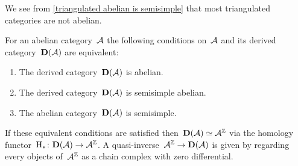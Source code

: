 \documentclass[a4paper,10pt]{scrartcl}
\begin{document}
We see from \cref{triangulated abelian is semisimple} that most triangulated categories are not abelian.

\begin{proposition}
  \label{when the derived is abelian}
  For an abelian category~$\mathcal{A}$ the following conditions on~$\mathcal{A}$ and its derived category~$\mathbf{D}(\mathcal{A})$ are equivalent:
  \begin{enumerate}
    \item
      \label{derived is abelian}
      The derived category~$\mathbf{D}(\mathcal{A})$ is abelian.
    \item
      \label{derived is semisimple abelian}
      The derived category~$\mathbf{D}(\mathcal{A})$ is semisimple abelian.
    \item
      \label{original is semisimple}
      The abelian category~$\mathbf{D}(\mathcal{A})$ is semisimple.
  \end{enumerate}
  If these equivalent conditions are satisfied then~$\mathbf{D}(\mathcal{A}) \simeq \mathcal{A}^{\mathbb{Z}}$ via the homology functor~$\operatorname{H}_* \colon \mathbf{D}(\mathcal{A}) \to \mathcal{A}^{\mathbb{Z}}$.
  A quasi-inverse~$\mathcal{A}^{\mathbb{Z}} \to \mathbf{D}(\mathcal{A})$ is given by regarding every objects of~$\mathcal{A}^{\mathbb{Z}}$ as a chain complex with zero differential.
\end{proposition}
\end{document}
